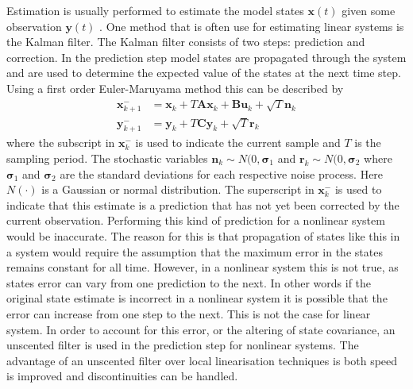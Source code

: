 Estimation is usually performed to estimate the model states $\mathbf{x}(t)$ given some observation $\mathbf{y}(t)$ . One method that is often use for estimating linear systems is the Kalman filter. The Kalman filter consists of two steps: prediction and correction. In the prediction step model states are propagated through the system and are used to determine the expected value of the states at the next time step. Using a first order Euler-Maruyama method this can be described by \begin{align}
\label{eqn: StateProgL}
\mathbf{x}_{k+1}^{-} &= \mathbf{x}_{k} + T\mathbf{A}\mathbf{x}_{k} +\mathbf{B}\mathbf{u}_{k}+\sqrt{T}\mathbf{n}_{k}\\
\label{eqn: YProp}
\mathbf{y}_{k+1}^{-}  &= \mathbf{y}_{k} + T\mathbf{C}\mathbf{y}_{k} +\sqrt{T}\mathbf{r}_{k}
\end{align} where the subscript in $\mathbf{x}_{k}^{-}$ is used to indicate the current sample and $T$ is the sampling period. The stochastic variables $\mathbf{n}_{k}\sim N(0,\mathbf{\sigma}_{1}$ and $\mathbf{r}_{k}\sim N(0,\mathbf{\sigma}_{2}$ where $\mathbf{\sigma}_{1}$ and $\mathbf{\sigma}_2$ are the standard deviations for each respective noise process. Here $N(\cdot)$ is a Gaussian or normal distribution. The superscript in $\mathbf{x}_{k}^{-}$ is used to indicate that this estimate is a prediction that has not yet been corrected by the current observation. Performing this kind of prediction for a nonlinear system would be inaccurate. The reason for this is that propagation of states like this in a system would require the assumption that the maximum error in the states remains constant for all time. However, in a nonlinear system this is not true, as states error can vary from one prediction to the next. In other words if the original state estimate is incorrect in a nonlinear system it is possible that the error can increase from one step to the next. This is not the case for linear system. In order to account for this error, or the altering of state covariance, an unscented filter is used in the prediction step for nonlinear systems. The advantage of an unscented filter over local linearisation techniques is both speed is improved and discontinuities can be handled. 

